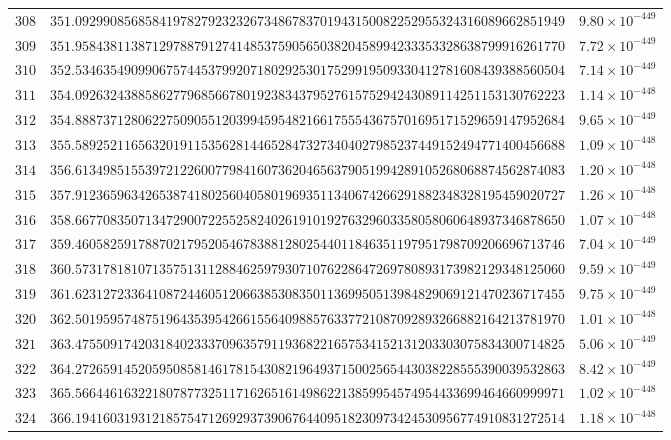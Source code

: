\documentclass[12pt,reqno]{amsart}
\theoremstyle{remark}
\begin{document}
\begin{longtable}{clc}
$308$ & $351.0929908568584197827923232673486783701943150082252955324316089662851949$ & $9.80\times 10^{-449}$ \\
$309$ & $351.9584381138712978879127414853759056503820458994233353328638799916261770$ & $7.72\times 10^{-449}$ \\
$310$ & $352.5346354909906757445379920718029253017529919509330412781608439388560504$ & $7.14\times 10^{-449}$ \\
$311$ & $354.0926324388586277968566780192383437952761575294243089114251153130762223$ & $1.14\times 10^{-448}$ \\
$312$ & $354.8887371280622750905512039945954821661755543675701695171529659147952684$ & $9.65\times 10^{-449}$ \\
$313$ & $355.5892521165632019115356281446528473273404027985237449152494771400456688$ & $1.09\times 10^{-448}$ \\
$314$ & $356.6134985155397212260077984160736204656379051994289105268068874562874083$ & $1.20\times 10^{-448}$ \\
$315$ & $357.9123659634265387418025604058019693511340674266291882348328195459020727$ & $1.26\times 10^{-448}$ \\
$316$ & $358.6677083507134729007225525824026191019276329603358058060648937346878650$ & $1.07\times 10^{-448}$ \\
$317$ & $359.4605825917887021795205467838812802544011846351197951798709206696713746$ & $7.04\times 10^{-449}$ \\
$318$ & $360.5731781810713575131128846259793071076228647269780893173982129348125060$ & $9.59\times 10^{-449}$ \\
$319$ & $361.6231272336410872446051206638530835011369950513984829069121470236717455$ & $9.75\times 10^{-449}$ \\
$320$ & $362.5019595748751964353954266155640988576337721087092893266882164213781970$ & $1.01\times 10^{-448}$ \\
$321$ & $363.4755091742031840233370963579119368221657534152131203303075834300714825$ & $5.06\times 10^{-449}$ \\
$322$ & $364.2726591452059508581461781543082196493715002565443038228555390039532863$ & $8.42\times 10^{-449}$ \\
$323$ & $365.5664461632218078773251171626516149862213859954574954433699464660999971$ & $1.02\times 10^{-448}$ \\
$324$ & $366.1941603193121857547126929373906764409518230973424530956774910831272514$ & $1.18\times 10^{-448}$ \\

\end{longtable}
\end{document}
